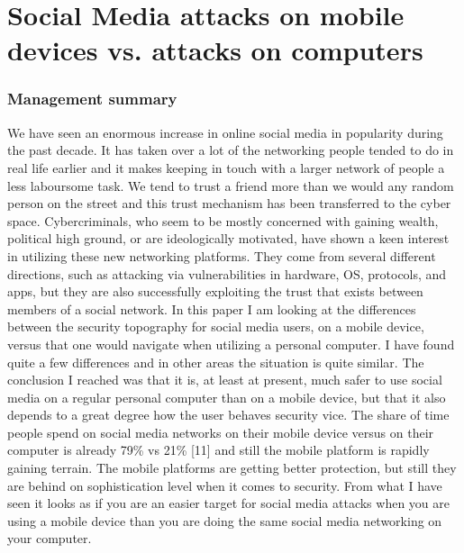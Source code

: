 \chapter[Social Media Attacks]{Social Media attacks on mobile devices vs. attacks on computers}
\subsection*{Management summary}
We have seen an enormous increase in online social media in popularity during the past decade. It has taken over a lot of the networking people tended to do in real life earlier and it makes keeping in touch with a larger network of people a less laboursome task. We tend to trust a friend more than we would any random person on the street and this trust mechanism has been transferred to the cyber space. Cybercriminals, who seem to be mostly concerned with gaining wealth, political high ground, or are ideologically motivated, have shown a keen interest in utilizing these new networking platforms. They come from several different directions, such as attacking via vulnerabilities in hardware, OS, protocols, and apps, but they are also successfully exploiting the trust that exists between members of a social network.
In this paper I am looking at the differences between the security topography for social media users, on a mobile device, versus that one would navigate when utilizing a personal computer. I have found quite a few differences and in other areas the situation is quite similar. The conclusion I reached was that it is, at least at present, much safer to use social media on a regular personal computer than on a mobile device, but that it also depends to a great degree how the user behaves security vice. The share of time people spend on social media networks on their mobile device versus on their computer is already 79\% vs 21\% [11] and still the mobile platform is rapidly gaining terrain. The mobile platforms are getting better protection, but still they are behind on sophistication level when it comes to security. From what I have seen it looks as if you are an easier target for social media attacks when you are using a mobile device than you are doing the same social media networking on your computer.
